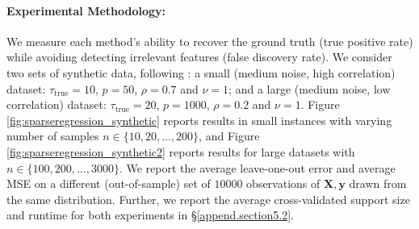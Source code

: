 \documentclass[mnsc,nonblindrev]{informs3} %
\begin{document}


\paragraph{Experimental Methodology: } We measure each method's ability to recover the ground truth (true positive rate) while avoiding detecting irrelevant features (false discovery rate). We consider two sets of synthetic data, following \cite{bertsimas2020sparse2}: a small (medium noise, high correlation) dataset: $\tau_{\text{true}}=10$, $p=50$, $\rho=0.7$ and $\nu=1$; and a large (medium noise, low correlation) dataset: $\tau_{\text{true}}=20$, $p=1000$, $\rho=0.2$ and $\nu=1$. Figure \ref{fig:sparseregression_synthetic} reports results in small instances with varying number of samples $n \in \{10, 20, \ldots, 200\}$, and Figure \ref{fig:sparseregression_synthetic2} reports results for large datasets with  $n \in \{100, 200, \ldots, 3000\}$. We report the average leave-one-out error and average MSE on a different (out-of-sample) set of $10000$ observations of $\bm{X}, \bm{y}$ drawn from the same distribution. Further, we report the average cross-validated support size and runtime for both experiments in \S \ref{append.section5.2}.
\end{document}
